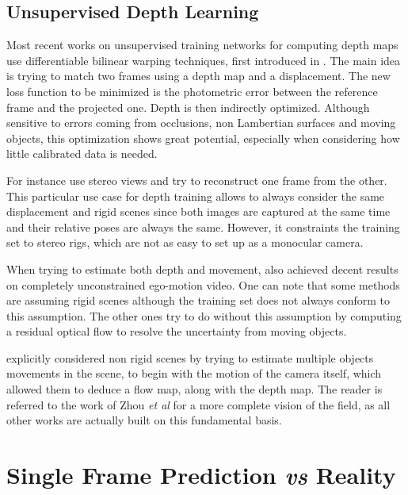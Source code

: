 \documentclass[runningheads]{llncs}
\def\etal{\emph{et al}\:}
\begin{document}
 
\subsection{Unsupervised Depth Learning}
Most recent works on unsupervised training networks for computing depth maps use differentiable bilinear warping techniques, first introduced in \cite{jaderberg2015spatial}. The main idea is trying to match two frames using a depth map and a displacement. The new loss function to be minimized is the photometric error between the reference frame and the projected one. Depth is then indirectly optimized. Although sensitive to errors coming from occlusions, non Lambertian surfaces and moving objects, this optimization shows great potential, especially when considering how little calibrated data is needed.

For instance \cite{monodepth17, garg2016unsupervised, xie2016deep3d} use stereo views and try to reconstruct one frame from the other. This particular use case for depth training allows to always consider the same displacement and rigid scenes since both images are captured at the same time and their relative poses are always the same. However, it constraints the training set to stereo rigs, which are not as easy to set up as a monocular camera.

When trying to estimate both depth and movement, \cite{zhou2017unsupervised, yin2018geonet, Mahjourian, DBLP:journals/corr/abs-1805-09806} also achieved decent results on completely unconstrained ego-motion video. One can note that some methods \cite{zhou2017unsupervised} are assuming rigid scenes although the training set does not always conform to this assumption. The other ones try to 
do without this assumption by computing
a residual optical flow 
to resolve
the uncertainty from moving objects.

\cite{Vijayanarasimhan17} explicitly considered non rigid scenes by trying to estimate multiple objects movements in the scene, to begin with the motion of the camera itself, which allowed them to deduce a flow map, along with the depth map. The reader is 
referred to
the work of Zhou \etal \cite{zhou2017unsupervised} for a more complete vision of the field, as all other works 
are actually built
on this fundamental basis.

\section{Single Frame Prediction 
{\em vs}
Reality}
\end{document}
